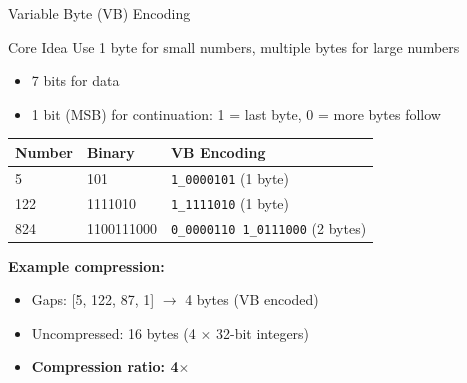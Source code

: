 \documentclass[aspectratio=169]{beamer}
\begin{document}
\begin{frame}[shrink=10]{Variable Byte (VB) Encoding}
\begin{block}{Core Idea}
Use 1 byte for small numbers, multiple bytes for large numbers
\begin{itemize}
    \item 7 bits for data
    \item 1 bit (MSB) for continuation: 1 = last byte, 0 = more bytes follow
\end{itemize}
\end{block}

\vspace{1em}

\begin{table}
\centering
\begin{tabular}{lll}
\toprule
\textbf{Number} & \textbf{Binary} & \textbf{VB Encoding} \\
\midrule
5 & 101 & \texttt{1\_0000101} (1 byte) \\
122 & 1111010 & \texttt{1\_1111010} (1 byte) \\
824 & 1100111000 & \texttt{0\_0000110 1\_0111000} (2 bytes) \\
\bottomrule
\end{tabular}
\end{table}

\vspace{1em}

\textbf{Example compression:}
\begin{itemize}
    \item Gaps: [5, 122, 87, 1] $\rightarrow$ 4 bytes (VB encoded)
    \item Uncompressed: 16 bytes (4 $\times$ 32-bit integers)
    \item \textbf{Compression ratio: 4$\times$}
\end{itemize}
\end{frame}
\end{document}
